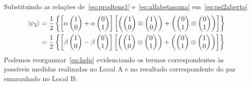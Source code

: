 Substituindo as relações de~\eqref{eq:prodtens1} e~\eqref{eq:alfabetasoma} em~\eqref{eq:psi2aberto}
\begin{equation}\label{eq:help}
  \begin{split}
\ket{\psi_2} &= \frac{1}{2}\left\{\left[\alpha\begin{pmatrix}
1 \\
0
\end{pmatrix}+\alpha\begin{pmatrix}
0 \\
1
\end{pmatrix}\right]\left[\left(\begin{pmatrix}
1 \\
0
\end{pmatrix} \otimes \begin{pmatrix}
1 \\
0
\end{pmatrix}\right) + \left(\begin{pmatrix}
0 \\
1
\end{pmatrix} \otimes \begin{pmatrix}
0 \\
1
\end{pmatrix}\right)\right]\right\} \nonumber \\
&= \frac{1}{2}\left\{\left[\beta\begin{pmatrix}
1 \\
0
\end{pmatrix}-\beta\begin{pmatrix}
0 \\
1
\end{pmatrix}\right]\left[\left(\begin{pmatrix}
1 \\
0
\end{pmatrix} \otimes \begin{pmatrix}
0 \\
1
\end{pmatrix}\right) + \left(\begin{pmatrix}
0 \\
1
\end{pmatrix} \otimes \begin{pmatrix}
1 \\
0
\end{pmatrix}\right)\right]\right\}
  \end{split}
\end{equation}
Podemos reorganizar~\eqref{eq:help} evidenciando os termos correspondentes às possíveis medidas realizadas no Local A e no resultado correspondente do par emaranhado no Local B:
